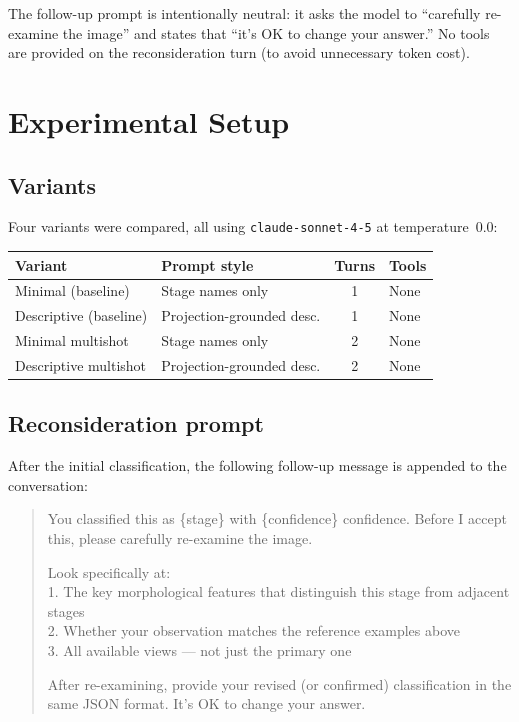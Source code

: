 \documentclass[11pt, a4paper]{article}
\begin{document}
The follow-up prompt is intentionally neutral: it asks the model to ``carefully
re-examine the image'' and states that ``it's OK to change your answer.''  No
tools are provided on the reconsideration turn (to avoid unnecessary token cost).

\section{Experimental Setup}

\subsection{Variants}

Four variants were compared, all using \texttt{claude-sonnet-4-5} at
temperature~0.0:

\begin{center}
\small
\begin{tabular}{@{}llcl@{}}
\toprule
\textbf{Variant} & \textbf{Prompt style} & \textbf{Turns} & \textbf{Tools} \\
\midrule
Minimal (baseline)         & Stage names only         & 1 & None \\
Descriptive (baseline)     & Projection-grounded desc. & 1 & None \\
Minimal multishot          & Stage names only         & 2 & None \\
Descriptive multishot      & Projection-grounded desc. & 2 & None \\
\bottomrule
\end{tabular}
\end{center}

\subsection{Reconsideration prompt}

After the initial classification, the following follow-up message is appended to
the conversation:

\begin{quote}\small\ttfamily
You classified this as \{stage\} with \{confidence\} confidence.
Before I accept this, please carefully re-examine the image.

Look specifically at:\\
1. The key morphological features that distinguish this stage from adjacent stages\\
2. Whether your observation matches the reference examples above\\
3. All available views --- not just the primary one

After re-examining, provide your revised (or confirmed) classification
in the same JSON format. It's OK to change your answer.
\end{quote}
\end{document}
